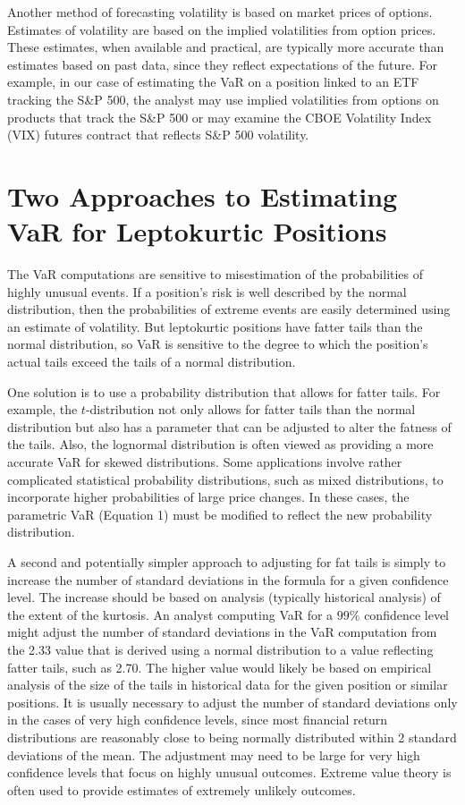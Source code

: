 \documentclass[11pt]{article}
\begin{document}
Another method of forecasting volatility is based on market prices of options. Estimates of volatility are based on the implied volatilities from option prices. These estimates, when available and practical, are typically more accurate than estimates based on past data, since they reflect expectations of the future. For example, in our case of estimating the VaR on a position linked to an ETF tracking the S\&P 500, the analyst may use implied volatilities from options on products that track the S\&P 500 or may examine the CBOE Volatility Index (VIX) futures contract that reflects S\&P 500 volatility.

\section*{Two Approaches to Estimating VaR for Leptokurtic Positions}
The VaR computations are sensitive to misestimation of the probabilities of highly unusual events. If a position's risk is well described by the normal distribution, then the probabilities of extreme events are easily determined using an estimate of volatility. But leptokurtic positions have fatter tails than the normal distribution, so VaR is sensitive to the degree to which the position's actual tails exceed the tails of a normal distribution.

One solution is to use a probability distribution that allows for fatter tails. For example, the $t$-distribution not only allows for fatter tails than the normal distribution but also has a parameter that can be adjusted to alter the fatness of the tails. Also, the lognormal distribution is often viewed as providing a more accurate VaR for skewed distributions. Some applications involve rather complicated statistical probability distributions, such as mixed distributions, to incorporate higher probabilities of large price changes. In these cases, the parametric VaR (Equation 1) must be modified to reflect the new probability distribution.

A second and potentially simpler approach to adjusting for fat tails is simply to increase the number of standard deviations in the formula for a given confidence level. The increase should be based on analysis (typically historical analysis) of the extent of the kurtosis. An analyst computing VaR for a $99 \%$ confidence level might adjust the number of standard deviations in the VaR computation from the 2.33 value that is derived using a normal distribution to a value reflecting fatter tails, such as 2.70. The higher value would likely be based on empirical analysis of the size of the tails in historical data for the given position or similar positions. It is usually necessary to adjust the number of standard deviations only in the cases of very high confidence levels, since most financial return distributions are reasonably close to being normally distributed within 2 standard deviations of the mean. The adjustment may need to be large for very high confidence levels that focus on highly unusual outcomes. Extreme value theory is often used to provide estimates of extremely unlikely outcomes.
\end{document}
